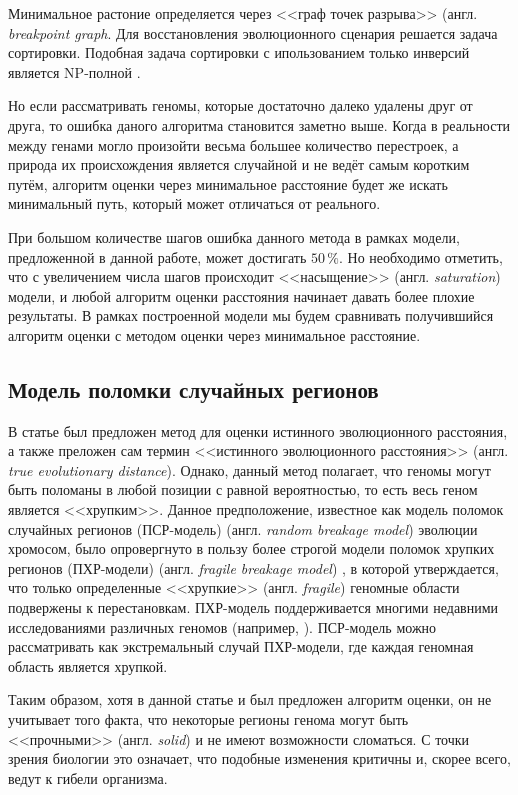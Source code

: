 Минимальное растоние определяется через <<граф точек разрыва>> (англ. \textit{breakpoint graph}.
Для восстановления эволюционного сценария решается задача сортировки.
Подобная задача сортировки с ипользованием только инверсий является NP-полной \cite{sorting-is-difficult}.

Но если рассматривать геномы, которые достаточно далеко удалены друг от друга, то ошибка даного алгоритма становится заметно выше.
Когда в реальности между генами могло произойти весьма большее количество перестроек, а природа их происхождения является случайной и не ведёт самым коротким путём, алгоритм оценки через минимальное расстояние будет же искать минимальный путь, который может отличаться от реального.

При большом количестве шагов ошибка данного метода в рамках модели, предложенной в данной работе, может достигать $50 \, \%$.
Но необходимо отметить, что с увеличением числа шагов происходит <<насыщение>> (англ. \textit{saturation}) модели, и любой алгоритм оценки расстояния начинает давать более плохие результаты.
В рамках построенной модели мы будем сравнивать получившийся алгоритм оценки с методом оценки через минимальное расстояние.

\subsection{Модель поломки случайных регионов}

В статье \cite{termin} был предложен метод для оценки истинного эволюционного расстояния, а также преложен сам термин <<истинного эволюционного расстояния>> (англ. \textit{true evolutionary distance}).
Однако, данный метод полагает, что геномы могут быть поломаны в любой позиции с равной вероятностью, то есть весь геном является <<хрупким>>.
Данное предположение, известное как модель поломок случайных регионов (ПСР-модель) (англ. \textit{random breakage model}) эволюции хромосом, было опровергнуто в пользу более строгой модели поломок хрупких регионов (ПХР-модели) (англ. \textit{fragile breakage model}) \cite{mouse}, в которой утверждается, что только определенные <<хрупкие>> (англ. \textit{fragile}) геномные области подвержены к перестановкам.
ПХР-модель поддерживается многими недавними исследованиями различных геномов (например, \cite{fragile}).
ПСР-модель можно рассматривать как экстремальный случай ПХР-модели, где каждая геномная область является хрупкой.

Таким образом, хотя в данной статье и был предложен алгоритм оценки, он не учитывает того факта, что некоторые регионы генома могут быть <<прочными>> (англ. \textit{solid}) и не имеют возможности сломаться. С точки зрения биологии это означает, что подобные изменения критичны и, скорее всего, ведут к гибели организма.

